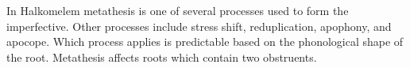 In Halkomelem metathesis is one of several processes used to form the imperfective.
Other processes include stress shift, reduplication, apophony, and apocope.
Which process applies is predictable based on the phonological shape of the root.
Metathesis affects roots which contain two obstruents.
%
